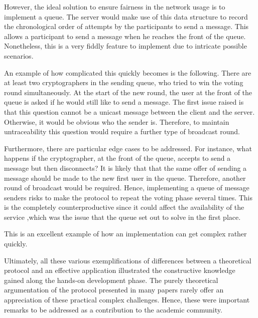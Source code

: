 However, the ideal solution to ensure fairness in the network usage is to implement a queue. The server would make use of this data structure to record the chronological order of attempts by the participants to send a message. This allows a participant to send a message when he reaches the front of the queue. Nonetheless, this is a very fiddly feature to implement due to intricate possible scenarios. 


An example of how complicated this quickly becomes is the following. There are at least two cryptographers in the sending queue, who tried to win the voting round simultaneously. At the start of the new round, the user at the front of the queue is asked if he would still like to send a message. The first issue raised is that this question cannot be a unicast message between the client and the server. Otherwise, it would be obvious who the sender is. Therefore, to maintain untraceability this question would require a further type of broadcast round. 

Furthermore, there are particular edge cases to be addressed. For instance, what happens if the cryptographer, at the front of the queue, accepts to send a message but then disconnects? It is likely that that the same offer of sending a message should be made to the new first user in the queue. Therefore, another round of broadcast would be required. Hence, implementing a queue of message senders risks to make the protocol to repeat the voting phase several times. This is the completely counterproductive since it could affect the availability of the service ,which was the issue that the queue set out to solve in the first place. 

This is an excellent example of how an implementation can get complex rather quickly. \newline \newline




Ultimately, all these various exemplifications of differences between a theoretical protocol and an effective application illustrated the constructive knowledge gained along the hands-on development phase. The purely theoretical argumentation of the protocol presented in many papers rarely offer an appreciation of these practical complex challenges. Hence, these were important remarks to be addressed as a contribution to the academic community.

